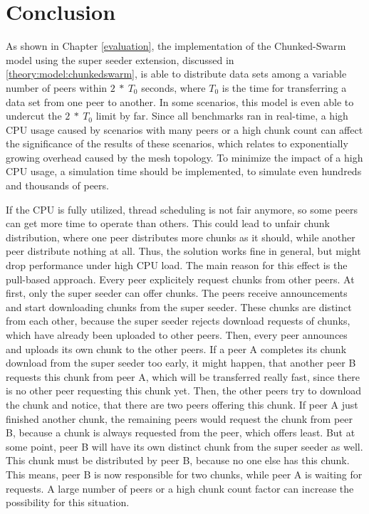 
\chapter{Conclusion}
\label{conclusion}

As shown in Chapter \ref{evaluation}, the implementation of the Chunked-Swarm model using the super seeder extension, discussed in \ref{theory:model:chunkedswarm}, is able to distribute data sets among a variable number of peers within $2\:*\:T_0$ seconds, where $T_0$ is the time for transferring a data set from one peer to another. In some scenarios, this model is even able to undercut the $2\:*\:T_0$ limit by far. Since all benchmarks ran in real-time, a high CPU usage caused by scenarios with many peers or a high chunk count can affect the significance of the results of these scenarios, which relates to exponentially growing overhead caused by the mesh topology. To minimize the impact of a high CPU usage, a simulation time should be implemented, to simulate even hundreds and thousands of peers.

If the CPU is fully utilized, thread scheduling is not fair anymore, so some peers can get more time to operate than others. This could lead to unfair chunk distribution, where one peer distributes more chunks as it should, while another peer distribute nothing at all. Thus, the solution works fine in general, but might drop performance under high CPU load. The main reason for this effect is the pull-based approach. Every peer explicitely request chunks from other peers. At first, only the super seeder can offer chunks. The peers receive announcements and start downloading chunks from the super seeder. These chunks are distinct from each other, because the super seeder rejects download requests of chunks, which have already been uploaded to other peers. Then, every peer announces and uploads its own chunk to the other peers. If a peer A completes its chunk download from the super seeder too early, it might happen, that another peer B requests this chunk from peer A, which will be transferred really fast, since there is no other peer requesting this chunk yet. Then, the other peers try to download the chunk and notice, that there are two peers offering this chunk. If peer A just finished another chunk, the remaining peers would request the chunk from peer B, because a chunk is always requested from the peer, which offers least. But at some point, peer B will have its own distinct chunk from the super seeder as well. This chunk must be distributed by peer B, because no one else has this chunk. This means, peer B is now responsible for two chunks, while peer A is waiting for requests. A large number of peers or a high chunk count factor can increase the possibility for this situation.

